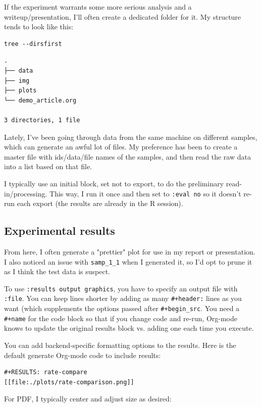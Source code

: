 \documentclass[11pt]{article}
\begin{document}
If the experiment warrants some more serious analysis and a writeup/presentation, I'll often create a
dedicated folder for it. My structure tends to look like this:

\begin{verbatim}
tree --dirsfirst
\end{verbatim}

\begin{verbatim}
.
├── data
├── img
├── plots
└── demo_article.org

3 directories, 1 file
\end{verbatim}

Lately, I've been going through data from the same machine on different samples, which
can generate an awful lot of files. My preference has been to create a master file with
ids/data/file names of the samples, and then read the raw data into a list based on that
file. 

I typically use an initial block, set not to export, to do the preliminary
read-in/processing. This way, I run it once and then set to \texttt{:eval no} so it doesn't
re-run each export (the results are already in the R session).

\subsection*{Experimental results}
\label{sec:orgheadline21}

From here, I often generate a "prettier" plot for use in my report or presentation. I also
noticed an issue with \texttt{samp\_1\_1} when I generated it, so I'd opt to prune it as I think the
test data is suspect.

To use \texttt{:results output graphics}, you  have to specify an output file with \texttt{:file}. You
can keep lines shorter by adding as many \texttt{\#+header:} lines as you want (which supplements
the options passed after \texttt{\#+begin\_src}. You need a \texttt{\#+name} for the code block so that if
you change code and re-run, Org-mode knows to update the original results block vs. adding
one each time you execute.

You can add backend-specific formatting options to the results. Here is the default
generate Org-mode code to include results:

\begin{verbatim}
#+RESULTS: rate-compare
[[file:./plots/rate-comparison.png]]
\end{verbatim}

For PDF, I typically center and adjust size as desired:
\end{document}

